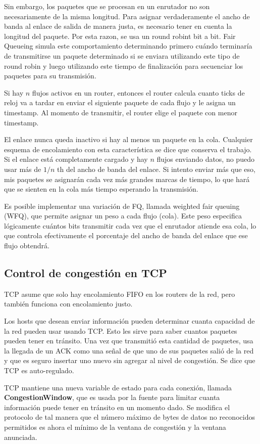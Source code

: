 Sin embargo, los paquetes que se procesan en un enrutador no son necesariamente de la misma longitud. Para asignar verdaderamente el ancho de banda al enlace de salida de manera justa, es necesario tener en cuenta la longitud del paquete. Por esta razon, se usa un round robint bit a bit. Fair Queueing simula este comportamiento determinando primero cuándo terminaría de transmitirse un paquete determinado si se enviara utilizando este tipo de round robin y luego utilizando este tiempo de finalización para secuenciar los paquetes para su transmisión.

Si hay \(n\) flujos activos en un router, entonces el router calcula cuanto ticks de reloj va a tardar en enviar el siguiente paquete de cada flujo y le asigna un timestamp. Al momento de transmitir, el router elige el paquete con menor timestamp.

El enlace nunca queda inactivo si hay al menos un paquete en la cola. Cualquier esquema de encolamiento con esta característica se dice que conserva el trabajo. Si el enlace está completamente cargado y hay \(n\) flujos enviando datos, no puedo usar más de \(1/n\) th del ancho de banda del enlace. Si intento enviar más que eso, mis paquetes se asignarán cada vez más grandes marcas de tiempo, lo que hará que se sienten en la cola más tiempo esperando la transmisión.

Es posible implementar una variación de FQ, llamada weighted fair queuing (WFQ), que permite asignar un peso a cada flujo (cola). Este peso especifica lógicamente cuántos bits transmitir cada vez que el enrutador atiende esa cola, lo que controla efectivamente el porcentaje del ancho de banda del enlace que ese flujo obtendrá.

\subsection{Control de congestión en TCP}
TCP asume que solo hay encolamiento FIFO en los routers de la red, pero también funciona con encolamiento justo.

Los hosts que desean enviar información pueden determinar cuanta capacidad de la red pueden usar usando TCP. Esto les sirve para saber cuantos paquetes pueden tener en tránsito. Una vez que transmitió esta cantidad de paquetes, usa la llegada de un ACK como una señal de que uno de sus paquetes salió de la red y que es seguro insertar uno nuevo sin agregar al nivel de congestión. Se dice que TCP es auto-regulado.

TCP mantiene una nueva variable de estado para cada conexión, llamada \textbf{CongestionWindow}, que es usada por la fuente para limitar cuanta información puede tener en tránsito en un momento dado. Se modifica el protocolo de tal manera que el número máximo de bytes de datos no reconocidos permitidos es ahora el mínimo de la ventana de congestión y la ventana anunciada.

